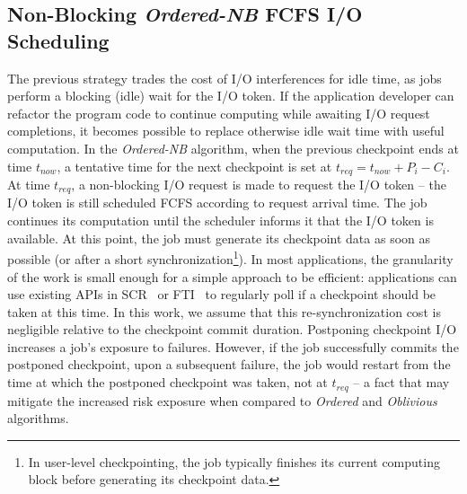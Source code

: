 \documentclass[two]{article}
\newcommand{\period}[1]{P_{#1}}
\newcommand{\ckpt}[1]{C_{#1}}
\newcommand{\dca}[1]{\todo[inline]{DCA: #1}}
\newcommand{\nocoop}{\emph{Oblivious}\xspace}
\newcommand{\fifoblock}{\emph{Ordered}\xspace}
\newcommand{\fifononblock}{\emph{Ordered-NB}\xspace}
\def\bfifofixed{\fifoblock-Fixed\xspace}
\def\bfifodaly{\fifoblock-Daly\xspace}
\begin{document}

\subsection{Non-Blocking \fifononblock FCFS I/O Scheduling}
\label{sec:fcfsnonblock}

The previous strategy trades the cost of I/O interferences for idle time, as
jobs perform a blocking (idle) wait for the I/O token.  If the application
developer can refactor the program code to continue computing while awaiting
I/O request completions, it becomes possible to replace otherwise idle wait
time with useful computation. In the \fifononblock algorithm, when the previous
checkpoint ends at time $t_{now}$, a tentative time for the next checkpoint is
set at $t_{req}=t_{now}+\period{i}-\ckpt{i}$.  At time $t_{req}$, a
non-blocking I/O request is made to request the I/O token -- the I/O token is
still scheduled FCFS according to request arrival time.  The job continues its
computation until the scheduler informs it that the I/O token is available. At
this point, the job must generate its checkpoint data as soon as possible (or
after a short synchronization\footnote{In user-level checkpointing, the job
typically finishes its current computing block before generating its checkpoint
data.}).  In most applications, the granularity of the work is small enough for
a simple approach to be efficient: applications can use existing APIs in
SCR~\cite{Moody10SCR} or FTI~\cite{Bautista-Gomez11_FTI} to regularly poll if a
checkpoint should be taken at this time. In this work, we assume that this
re-synchronization cost is negligible relative to the checkpoint commit
duration.
%
%
Postponing checkpoint I/O increases a job's exposure to failures.  However,
if the job successfully commits the postponed checkpoint, upon a subsequent failure,
the job would restart from the time at which the postponed checkpoint was taken, not
at $t_{req}$ -- a fact that may mitigate the increased risk exposure when
compared to \fifoblock and \nocoop algorithms.

\end{document}
